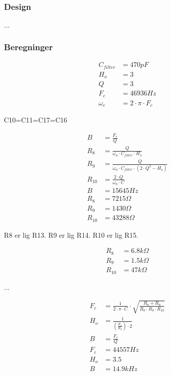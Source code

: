 \subsubsection{Design}
...

\subsubsection{Beregninger}

\begin{equation}
\label{eq:FilterParametre}
\begin{split}
C_{filter} & = 470pF\\
H_o & = 3\\
Q & = 3\\
F_c & = 46936Hz \\
\omega_c & = 2 \cdot \pi \cdot F_c
\end{split}
\end{equation}

C10=C11=C17=C16

\begin{equation}
\label{eq:FilterModstandeBW}
\begin{split}
B & = \frac{F_c}{Q} \\
R_8 & = \frac{Q}{\omega_n \cdot C_{filter} \cdot H_o } \\
R_9 & = \frac{Q}{ \omega_n \cdot C_{filter} \cdot \left( 2 \cdot Q^2 - H_o \right) } \\
R_{10} & = \frac{2 \cdot Q}{ \omega_n \cdot C} \\
B & = 15645Hz \\
R_8 & = 7215 \Omega \\
R_9 & = 1430 \Omega \\
R_{10} & = 43288 \Omega
\end{split}
\end{equation}

R8 er lig R13. R9 er lig R14. R10 er lig R15.

\begin{equation}
\label{eq:FilterModstandeTilnaermelse}
\begin{split}
R_8 & = 6.8k \Omega \\
R_9 & = 1.5k \Omega \\
R_{10} & = 47k \Omega
\end{split}
\end{equation}

...

\begin{equation}
\label{FilterAendringer}
\begin{split}
F_c & = \frac{1}{2 \cdot \pi \cdot C} \cdot \sqrt{\frac{R_8+R_9}{R_8 \cdot R_9 \cdot R_{10}}} \\
H_o & = \frac{1}{\left( \frac{R_1}{R_3} \right) \cdot 2} \\
B & = \frac{F_c}{Q} \\
F_c & = 44557Hz \\
H_o & = 3.5 \\
B & = 14.9kHz
\end{split}
\end{equation}

